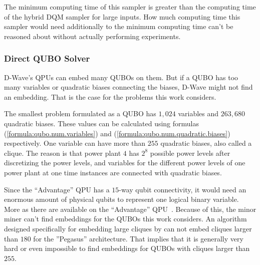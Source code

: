 The minimum computing time of this sampler is greater than the computing time of the hybrid DQM sampler for large inputs.
How much computing time this sampler would need additionally to the minimum computing time can't be reasoned about without actually performing experiments.

\subsubsection{Direct QUBO Solver}

D-Wave's QPUs can embed many QUBOs on them.
But if a QUBO has too many variables or quadratic biases connecting the biases, D-Wave might not find an embedding.
That is the case for the problems this work considers.

The smallest problem formulated as a QUBO has $1, 024$ variables and $263, 680$ quadratic biases.
These values can be calculated using formulas (\ref{formula:qubo.num.variables}) and (\ref{formula:qubo.num.quadratic.biases}) respectively.
One variable can have more than $255$ quadratic biases, also called a clique.
The reason is that power plant $4$ has $2^8$ possible power levels after discretizing the power levels, and variables for the different power levels of one power plant at one time instances are connected with quadratic biases.

Since the ``Advantage'' QPU has a $15$-way qubit connectivity, it would need an enormous amount of physical qubits to represent one logical binary variable.
More as there are available on the ``Advantage'' QPU~\cite{D-Wave2020, Zbinden2020}.
Because of this, the minor miner can't find embeddings for the QUBOs this work considers.
An algorithm designed specifically for embedding large cliques by \citeauthor{Zbinden2020} can not embed cliques larger than $180$ for the ''Pegasus'' architecture.
That implies that it is generally very hard or even impossible to find embeddings for QUBOs with cliques larger than $255$.
